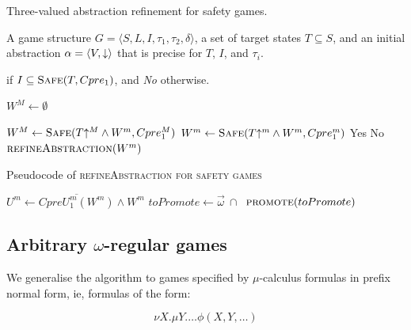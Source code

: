\begin{algorithm}
\caption{Three-valued abstraction refinement for safety games.}
\label{alg:three_val_safe}

\begin{algorithmic}[1]

\Require A game structure $G = \langle S, L, I, \tau_1, \tau_2, \delta \rangle$, a set 
of target states $T\subseteq S$, and an initial abstraction $\alpha=\langle V, \mathord{\downarrow} \rangle$
that is precise for $T$, $I$, and $\tau_i$.

 if $I \subseteq \textsc{Safe}(T, Cpre_1)$, and {\it No} otherwise.

    \State $W^M \gets \emptyset$

    \Loop
        \State $W^M \gets \textsc{Safe}(T\mathord{\uparrow^M} \wedge W^m, Cpre_1^M)$
        \State $W^m \gets \textsc{Safe}(T\mathord{\uparrow^m} \wedge W^m, Cpre_1^m)$
            \State\Return Yes
            \State\Return No
        \Else       
            \State$\Call{refineAbstraction}{W^m}$
        \EndIf
    \EndLoop
\EndFunction

\end{algorithmic}
\end{algorithm}

\begin{algorithm}

\caption{Pseudocode of \textsc{refineAbstraction for safety games}}
\label{alg:refineAbstractionSafe}

\begin{algorithmic}[1]
\State $U^m \gets \overline{CpreU_1^{m}(W^m)} \land W^m$
    \State $toPromote \gets \vec{\omega}~\cap~$
    \State $\Call{promote}{toPromote}$
\EndFunction
\end{algorithmic}
\end{algorithm}

\subsection{Arbitrary $\omega$-regular games}
\label{sec:omega_reg}

We generalise the algorithm to games specified by $\mu$-calculus formulas in prefix normal form, ie, formulas of the form:

\begin{equation}
\nu X. \mu Y. \ldots \phi(X, Y, \ldots)
\end{equation}

